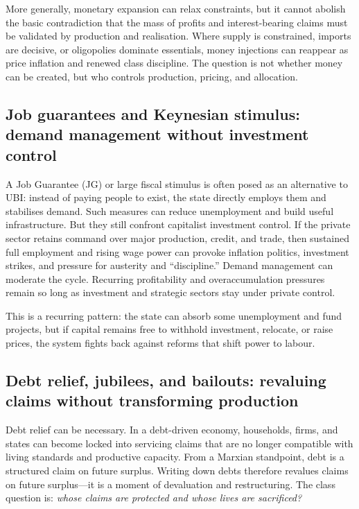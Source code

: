 More generally, monetary expansion can relax constraints, but it cannot abolish the basic contradiction that the mass of
profits and interest-bearing claims must be validated by production and realisation. Where supply is constrained, imports
are decisive, or oligopolies dominate essentials, money injections can reappear as price inflation and renewed class
discipline. The question is not whether money can be created, but who controls production, pricing, and allocation.

\subsection{Job guarantees and Keynesian stimulus: demand management without investment control}
\label{sec:policy-job-guarantee}

A Job Guarantee (JG) or large fiscal stimulus is often posed as an alternative to UBI: instead of paying people to exist,
the state directly employs them and stabilises demand. Such measures can reduce unemployment and build useful infrastructure.
But they still confront capitalist investment control. If the private sector retains command over major production, credit,
and trade, then sustained full employment and rising wage power can provoke inflation politics, investment strikes, and
pressure for austerity and ``discipline.'' Demand management can moderate the cycle. Recurring profitability and
overaccumulation pressures remain so long as investment and strategic sectors stay under
private control.

This is a recurring pattern: the state can absorb some unemployment and fund projects, but if capital remains free to
withhold investment, relocate, or raise prices, the system fights back against reforms that shift power to labour.

\subsection{Debt relief, jubilees, and bailouts: revaluing claims without transforming production}
\label{sec:policy-debt-relief}

Debt relief can be necessary. In a debt-driven economy, households, firms, and states can become locked into servicing
claims that are no longer compatible with living standards and productive capacity. From a Marxian standpoint, debt is a
structured claim on future surplus. Writing down debts therefore revalues claims on future surplus---it is a moment of
devaluation and restructuring. The class question is: \emph{whose claims are protected and whose lives are sacrificed?}

